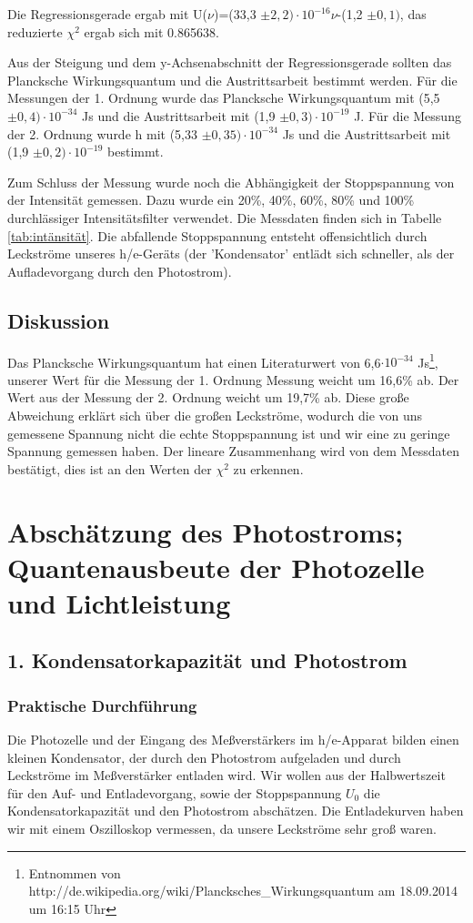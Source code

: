\documentclass[12px]{scrartcl}
\begin{document}
Die Regressionsgerade ergab mit U($\nu$)=(33,3 $\pm 2,2)\cdot10^{-16} \nu$-(1,2 $\pm 0,1)$, das reduzierte $\chi^2$ ergab sich mit 0.865638.

Aus der Steigung und dem y-Achsenabschnitt der Regressionsgerade sollten das Plancksche Wirkungsquantum und die Austrittsarbeit bestimmt werden. Für die Messungen der 1. Ordnung wurde das Plancksche Wirkungsquantum mit (5,5 $\pm 0,4)\cdot10^{-34}$ Js und die Austrittsarbeit mit (1,9 $\pm 0,3)\cdot10^{-19}$ J. Für die Messung der 2. Ordnung wurde h mit (5,33 $\pm 0,35)\cdot10^{-34}$ Js und die Austrittsarbeit mit (1,9 $\pm 0,2)\cdot10^{-19}$ bestimmt.

Zum Schluss der Messung wurde noch die Abhängigkeit der Stoppspannung von der Intensität gemessen. Dazu wurde ein 20\%, 40\%, 60\%, 80\% und 100\% durchlässiger Intensitätsfilter  verwendet. Die Messdaten finden sich in Tabelle \ref{tab:intänsität}. Die abfallende Stoppspannung entsteht offensichtlich durch Leckströme unseres h/e-Geräts (der 'Kondensator' entlädt sich schneller, als der Aufladevorgang durch den Photostrom).

\subsection{Diskussion}
Das Plancksche Wirkungsquantum hat einen Literaturwert von 6,6$\cdot 10^{-34}$ Js\footnote{Entnommen von http://de.wikipedia.org/wiki/Plancksches\_Wirkungsquantum am  18.09.2014 um 16:15 Uhr}, unserer Wert für die Messung der 1. Ordnung Messung weicht um 16,6\% ab. Der Wert aus der Messung der 2. Ordnung weicht um 19,7\% ab. Diese große  Abweichung erklärt sich über die großen Leckströme, wodurch die von uns gemessene Spannung nicht die echte Stoppspannung ist und wir eine zu geringe Spannung gemessen haben. Der lineare Zusammenhang wird von dem Messdaten bestätigt, dies ist an den Werten der $\chi^2$ zu erkennen.

\section{Abschätzung des Photostroms; Quantenausbeute der Photozelle und Lichtleistung}
\subsection{1. Kondensatorkapazität und Photostrom}
\subsubsection{Praktische Durchführung}
Die Photozelle und der Eingang des Meßverstärkers im h/e-Apparat bilden einen kleinen Kondensator, der durch den Photostrom aufgeladen und durch Leckströme im Meßverstärker entladen wird.
Wir wollen aus der Halbwertszeit für den Auf- und Entladevorgang, sowie der Stoppspannung $U_0$ die Kondensatorkapazität und den Photostrom abschätzen. Die Entladekurven haben wir mit einem Oszilloskop vermessen, da unsere Leckströme sehr groß waren.
\end{document}
